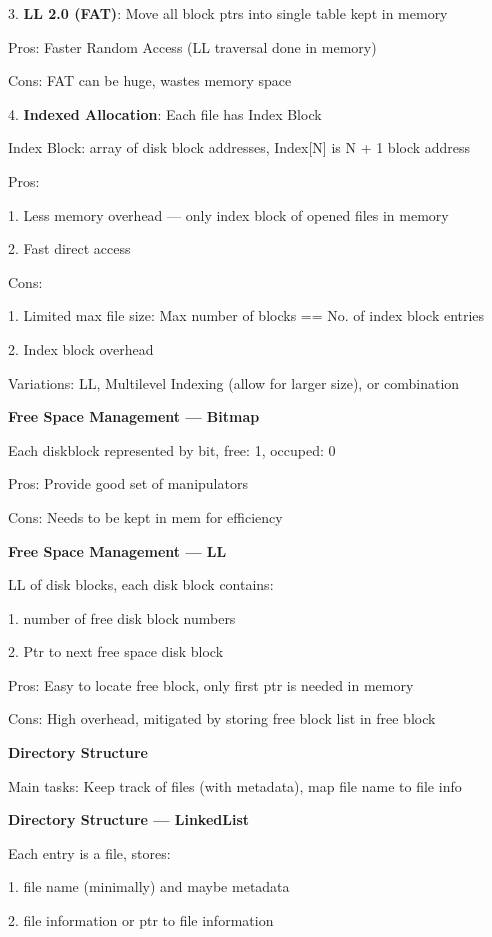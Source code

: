 \documentclass[10pt, a4paper]{article}
\newcommand{\blue}[1]{{\color{MidnightBlue}#1}}
\newcommand{\red}[1]{{\color{red}#1}}
\newcommand{\green}[1]{{\color{ForestGreen}#1}}
\begin{document}
\begin{multicols*}{3}
		3. \textbf{LL 2.0 (FAT)}: Move all block ptrs into single table kept in memory

		\green{Pros}: Faster Random Access (LL traversal done in memory)

		\red{Cons}: FAT can be huge, wastes memory space

		4. \textbf{Indexed Allocation}: Each file has \blue{Index Block}

		Index Block: array of disk block addresses, Index[N] is N + 1 block address

		\green{Pros}: 
		
		1. Less memory overhead --- only index block of opened files in memory

		2. Fast direct access

		\red{Cons}: 

		1. Limited max file size: Max number of blocks == No. of index block entries

		2. Index block overhead

		Variations: LL, Multilevel Indexing (allow for larger size), or combination

		\textbf{Free Space Management --- Bitmap}

		Each diskblock represented by bit, free: 1, occuped: 0

		\green{Pros}: Provide good set of manipulators

		\red{Cons}: Needs to be kept in mem for efficiency

		\textbf{Free Space Management --- LL}

		LL of disk blocks, each disk block contains:

		1. number of free disk block numbers

		2. Ptr to next free space disk block

		\green{Pros}: Easy to locate free block, only first ptr is needed in memory

		\red{Cons}: High overhead, mitigated by storing free block list in free block

		\textbf{Directory Structure}

		Main tasks: Keep track of files (with metadata), map file name to file info

		\textbf{Directory Structure --- LinkedList}

		Each entry is a file, stores:

		1. file name (minimally) and maybe metadata

		2. file information or ptr to file information


\end{multicols*}
\end{document}
